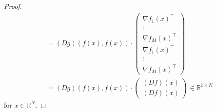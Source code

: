 \documentclass[a4paper, reqno]{amsart}
\newcommand{\R}{\mathbb R}
\theoremstyle{definition}
\numberwithin{equation}{section}
\begin{document}
\begin{proof}
\begin{align*}
			& = (Dg)(f(x), f(x)) \cdot \begin{pmatrix} 	\nabla f_1(x)^\top \\ \vdots \\ \nabla f_M(x)^\top \\ \nabla f_1(x)^\top \\ \vdots \\ \nabla f_M(x)^\top \end{pmatrix} \\
			& = (Dg)(f(x), f(x)) \cdot \begin{pmatrix} (Df)(x) \\ (Df)(x) \end{pmatrix} \in \R^{1\times N}
	\end{align*}
	for $x \in \R^N.$
\end{proof}
\end{document}
